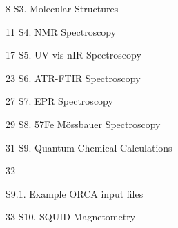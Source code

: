 
 
 
 
8 
S3. Molecular Structures 
 
 
 
 
 
 
 
 
 
 
 
 
11 
S4. NMR Spectroscopy  
 
 
 
 
 
 
 
 
 
 
 
 
17 
S5. UV-vis-nIR Spectroscopy  
 
 
 
 
 
 
 
 
 
 
 
23 
S6. ATR-FTIR Spectroscopy  
 
 
 
 
 
 
 
 
 
 
 
27 
S7. EPR Spectroscopy  
 
 
 
 
 
 
 
 
 
 
 
 
29 
S8. 57Fe Mössbauer Spectroscopy  
 
 
 
 
 
 
 
 
 
 
31 
S9. Quantum Chemical Calculations 
 
 
 
 
 
 
 
 
 
 
32 
 
S9.1.  
Example ORCA input files 
 
 
 
 
 
 
 
 
 
33 
S10. SQUID Magnetometry  
 
 
 
 
 
 
 
 
 
